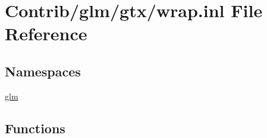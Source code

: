 \hypertarget{wrap_8inl}{}\section{Contrib/glm/gtx/wrap.inl File Reference}
\label{wrap_8inl}
\subsection*{Namespaces}
\begin{DoxyCompactItemize}
\item 
 \mbox{\hyperlink{namespaceglm}{glm}}
\end{DoxyCompactItemize}
\subsection*{Functions}
